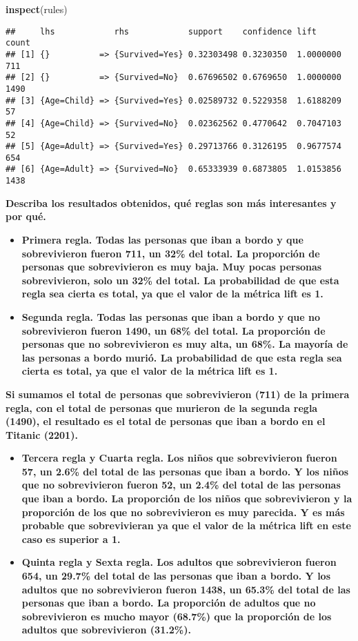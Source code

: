 \documentclass[]{article}
\newenvironment{Shaded}{\begin{snugshade}}{\end{snugshade}}
\newcommand{\KeywordTok}[1]{\textcolor[rgb]{0.13,0.29,0.53}{\textbf{#1}}}
\newcommand{\NormalTok}[1]{#1}
\begin{document}
\begin{Shaded}
\begin{Highlighting}[]
\KeywordTok{inspect}\NormalTok{(rules)}
\end{Highlighting}
\end{Shaded}

\begin{verbatim}
##     lhs            rhs            support    confidence lift      count
## [1] {}          => {Survived=Yes} 0.32303498 0.3230350  1.0000000  711 
## [2] {}          => {Survived=No}  0.67696502 0.6769650  1.0000000 1490 
## [3] {Age=Child} => {Survived=Yes} 0.02589732 0.5229358  1.6188209   57 
## [4] {Age=Child} => {Survived=No}  0.02362562 0.4770642  0.7047103   52 
## [5] {Age=Adult} => {Survived=Yes} 0.29713766 0.3126195  0.9677574  654 
## [6] {Age=Adult} => {Survived=No}  0.65333939 0.6873805  1.0153856 1438
\end{verbatim}

\textbf{Describa los resultados obtenidos, qué reglas son más
interesantes y por qué.}

\begin{itemize}
\item
  \textbf{Primera regla. Todas las personas que iban a bordo y que
  sobrevivieron fueron 711, un 32\% del total. La proporción de personas
  que sobrevivieron es muy baja. Muy pocas personas sobrevivieron, solo
  un 32\% del total. La probabilidad de que esta regla sea cierta es
  total, ya que el valor de la métrica lift es 1.}
\item
  \textbf{Segunda regla. Todas las personas que iban a bordo y que no
  sobrevivieron fueron 1490, un 68\% del total. La proporción de
  personas que no sobrevivieron es muy alta, un 68\%. La mayoría de las
  personas a bordo murió. La probabilidad de que esta regla sea cierta
  es total, ya que el valor de la métrica lift es 1.}
\end{itemize}

\textbf{Si sumamos el total de personas que sobrevivieron (711) de la
primera regla, con el total de personas que murieron de la segunda regla
(1490), el resultado es el total de personas que iban a bordo en el
Titanic (2201).}

\begin{itemize}
\item
  \textbf{Tercera regla y Cuarta regla. Los niños que sobrevivieron
  fueron 57, un 2.6\% del total de las personas que iban a bordo. Y los
  niños que no sobrevivieron fueron 52, un 2.4\% del total de las
  personas que iban a bordo. La proporción de los niños que
  sobrevivieron y la proporción de los que no sobrevivieron es muy
  parecida. Y es más probable que sobrevivieran ya que el valor de la
  métrica lift en este caso es superior a 1.}
\item
  \textbf{Quinta regla y Sexta regla. Los adultos que sobrevivieron
  fueron 654, un 29.7\% del total de las personas que iban a bordo. Y
  los adultos que no sobrevivieron fueron 1438, un 65.3\% del total de
  las personas que iban a bordo. La proporción de adultos que no
  sobrevivieron es mucho mayor (68.7\%) que la proporción de los adultos
  que sobrevivieron (31.2\%).}
\end{itemize}
\end{document}
